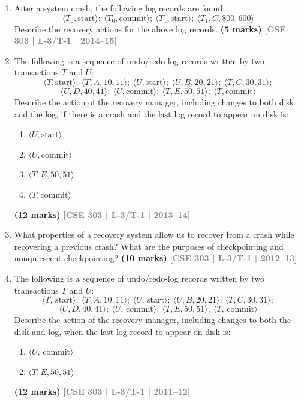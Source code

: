 \documentclass[12pt]{article}
\newcommand{\yr}[1]{\hfill\textcolor{gray}{\small\textbf{[#1]}}}
\newcommand{\mk}[1]{\textcolor{orange!70!black}{\small\textbf{(#1 marks)}}}
\begin{document}
\begin{enumerate}
\begin{enumerate}
  \item Write log records for the above transactions.
  \item Show the log-based recovery if a failure occurs after WRITE($A_3$).
  \item Show the recovery if a failure occurs after WRITE($A_2$).
\end{enumerate}
\mk{15} \yr{CSE 303 | L-3/T-1 | 2015--16}


\item After a system crash, the following log records are found:
\[\langle T_0,\text{start}\rangle;\ \langle T_0,\text{commit}\rangle;\ \langle T_1,\text{start}\rangle;\ \langle T_1,C,800,600\rangle\]
Describe the recovery actions for the above log records.
\mk{5} \yr{CSE 303 | L-3/T-1 | 2014--15}


\item The following is a sequence of undo/redo-log records written by two transactions $T$ and $U$:
\[\langle T,\text{start}\rangle;\ \langle T,A,10,11\rangle;\ \langle U,\text{start}\rangle;\ \langle U,B,20,21\rangle;\ \langle T,C,30,31\rangle;\]
\[\langle U,D,40,41\rangle;\ \langle U,\text{commit}\rangle;\ \langle T,E,50,51\rangle;\ \langle T,\text{commit}\rangle\]
Describe the action of the recovery manager, including changes to both disk and the log, if there is a crash and the last log record to appear on disk is:
\begin{enumerate}
  \item $\langle U,\text{start}\rangle$
  \item $\langle U,\text{commit}\rangle$
  \item $\langle T,E,50,51\rangle$
  \item $\langle T,\text{commit}\rangle$
\end{enumerate}
\mk{12} \yr{CSE 303 | L-3/T-1 | 2013--14}


\item What properties of a recovery system allow us to recover from a crash while recovering a previous crash? What are the purposes of checkpointing and nonquiescent checkpointing?
\mk{10} \yr{CSE 303 | L-3/T-1 | 2012--13}


\item The following is a sequence of undo/redo-log records written by two transactions $T$ and $U$:
\[\langle T,\,\text{start}\rangle;\ \langle T,A,10,11\rangle;\ \langle U,\,\text{start}\rangle;\ \langle U,B,20,21\rangle;\ \langle T,C,30,31\rangle;\]
\[\langle U,D,40,41\rangle;\ \langle U,\,\text{commit}\rangle;\ \langle T,E,50,51\rangle;\ \langle T,\,\text{commit}\rangle\]
Describe the action of the recovery manager, including changes to both the disk and log, when the last log record to appear on disk is:
\begin{enumerate}
  \item $\langle U,\,\text{commit}\rangle$
  \item $\langle T,E,50,51\rangle$
\end{enumerate}
  \mk{12} \yr{CSE 303 | L-3/T-1 | 2011--12}



\end{enumerate}
\end{document}
